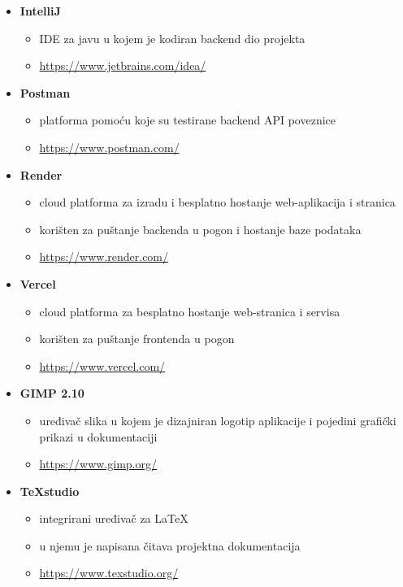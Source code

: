 \begin{itemize}
				\item \textbf{IntelliJ}
				\begin{itemize}
					\item IDE za javu u kojem je kodiran backend dio projekta
					\item \url{https://www.jetbrains.com/idea/}
				\end{itemize}
			
				\item \textbf{Postman}
				\begin{itemize}
					\item platforma pomoću koje su testirane backend API poveznice
					\item \url{https://www.postman.com/}
				\end{itemize}
			
				\item \textbf{Render}
				\begin{itemize}
					\item cloud platforma za izradu i besplatno hostanje web-aplikacija i stranica
					\item korišten za puštanje backenda u pogon i hostanje baze podataka
					\item \url{https://www.render.com/}
				\end{itemize}
				
				\item \textbf{Vercel}
				\begin{itemize}
					\item cloud platforma za besplatno hostanje web-stranica i servisa
					\item korišten za puštanje frontenda u pogon
					\item \url{https://www.vercel.com/}
				\end{itemize}
			
				\item \textbf{GIMP 2.10}
				\begin{itemize}
					\item uređivač slika u kojem je dizajniran logotip aplikacije i pojedini grafički prikazi u dokumentaciji
					\item \url{https://www.gimp.org/}
				\end{itemize}	
			
				\item \textbf{TeXstudio}
				\begin{itemize}
					\item integrirani uređivač za LaTeX
					\item u njemu je napisana čitava projektna dokumentacija
					\item \url{https://www.texstudio.org/}
				\end{itemize}
			

\end{itemize}
